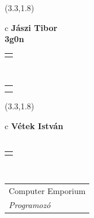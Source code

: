 \documentclass[11pt]{article}
\begin{document}
\makebox(3.3,1.8){
  \renewcommand\arraystretch{1.3}
  \begin{tabular}[c]{c}
    \hspace{8.5mm}
    \LARGE\bf{ Jászi Tibor }\\
    \hspace{8.5mm}
    \Large{ 3g0n }\\
    \renewcommand\arraystretch{3}
    \begin{tabular}[c]{c}
      \centering
      \fontfamily{phv}\selectfont{
        \textbf{
          \textsc{
            \scriptsize{
            \color{Bright}{ Ismerkedő }\color{Dark}{ Webmester }\color{Dark}{ Sminkmester }\color{Bright}{ Programozó }
            }
          }
        }
      }
    \end{tabular}
    \\
    \renewcommand\arraystretch{1}
    \begin{tabular}{p{3.3in}}
      \hspace{.7cm}\\
      \hspace{.7cm}\emph{  }\\
    \end{tabular}
  \end{tabular}
}

\makebox(3.3,1.8){
  \renewcommand\arraystretch{1.3}
  \begin{tabular}[c]{c}
    \hspace{8.5mm}
    \LARGE\bf{ Vétek István }\\
    \hspace{8.5mm}
    \Large{  }\\
    \renewcommand\arraystretch{3}
    \begin{tabular}[c]{c}
      \centering
      \fontfamily{phv}\selectfont{
        \textbf{
          \textsc{
            \scriptsize{
            \color{Dark}{ Ismerkedő }\color{Bright}{ Webmester }\color{Bright}{ Sminkmester }\color{Bright}{ Programozó }
            }
          }
        }
      }
    \end{tabular}
    \\
    \renewcommand\arraystretch{1}
    \begin{tabular}{p{3.3in}}
      \hspace{.7cm}Computer Emporium\\
      \hspace{.7cm}\emph{ Programozó }\\
    \end{tabular}
  \end{tabular}
}
\end{document}
